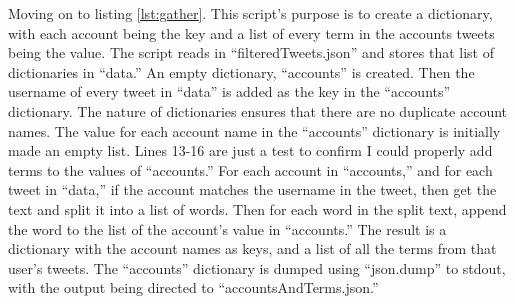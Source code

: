 \documentclass[12pt]{article}
\begin{document}
Moving on to listing \ref{lst:gather}.  This script's purpose is to create a dictionary, with each account being the key and a list of every term in the accounts tweets being the value.  The script reads in ``filteredTweets.json'' and stores that list of dictionaries in ``data.''  An empty dictionary, ``accounts'' is created.  Then the username of every tweet in ``data'' is added as the key in the ``accounts'' dictionary.  The nature of dictionaries ensures that there are no duplicate account names.  The value for each account name in the ``accounts'' dictionary is initially made an empty list.  Lines 13-16 are just a test to confirm I could properly add terms to the values of ``accounts.''  For each account in ``accounts,'' and for each tweet in ``data,'' if the account matches the username in the tweet, then get the text and split it into a list of words.  Then for each word in the split text, append the word to the list of the account's value in ``accounts.''  The result is a dictionary with the account names as keys, and a list of all the terms from that user's tweets.  The ``accounts'' dictionary is dumped using ``json.dump'' to stdout, with the output being directed to ``accountsAndTerms.json.''
\end{document}
